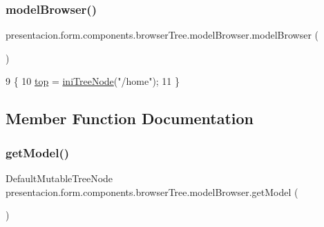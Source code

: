 \subsubsection{\texorpdfstring{model\+Browser()}{modelBrowser()}}
{\footnotesize\ttfamily presentacion.\+form.\+components.\+browser\+Tree.\+model\+Browser.\+model\+Browser (\begin{DoxyParamCaption}{ }\end{DoxyParamCaption})\hspace{0.3cm}{\ttfamily [inline]}}


\begin{DoxyCode}
9                           \{
10         \hyperlink{classpresentacion_1_1form_1_1components_1_1browserTree_1_1modelBrowser_a9fc1c6e81c509d87948fb3e47b79204b}{top} = \hyperlink{classpresentacion_1_1form_1_1components_1_1browserTree_1_1modelBrowser_afcbfb73081526954d46d410be9821848}{iniTreeNode}(\textcolor{stringliteral}{"/home"});
11     \}
\end{DoxyCode}


\subsection{Member Function Documentation}
\mbox{\label{classpresentacion_1_1form_1_1components_1_1browserTree_1_1modelBrowser_ad0362719968bd949b1b1639eba9c2e3b}} 
\subsubsection{\texorpdfstring{get\+Model()}{getModel()}}
{\footnotesize\ttfamily Default\+Mutable\+Tree\+Node presentacion.\+form.\+components.\+browser\+Tree.\+model\+Browser.\+get\+Model (\begin{DoxyParamCaption}{ }\end{DoxyParamCaption})\hspace{0.3cm}{\ttfamily [inline]}}


